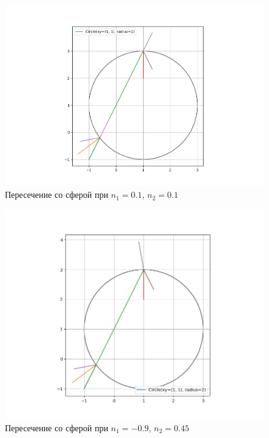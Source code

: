{	\begin{figure}[H]
		\includegraphics[width=0.7\pagewidth]{sph_intersect1}
		\centering
		\caption{Пересечение со сферой при $n_1 = 0.1$, $n_2 = 0.1$}
		\label{sph_intersect1}
	\end{figure}
	
	\begin{figure}[H]
		\includegraphics[width=0.7\pagewidth]{sph_intersect2}
		\centering
		\caption{Пересечение со сферой при $n_1 = -0.9$, $n_2 = 0.45$}
		\label{sph_intersect2}
	\end{figure}
	
}
